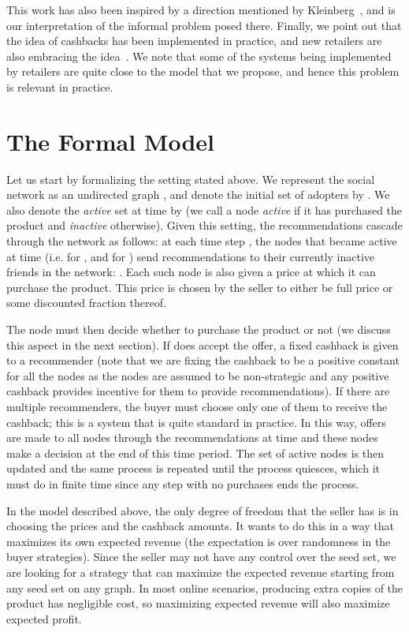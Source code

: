 \documentclass[letterpaper,twoside]{article}
\begin{document}
This work has also been inspired by a direction mentioned by
Kleinberg~\cite{Kleinberg_AGT07}, and is our interpretation of the informal
problem posed there. Finally, we point out that the idea of cashbacks has
been implemented in practice, and new retailers are also embracing the
idea~\cite{LSK06,LAH07,Schon08}. We note that some of the systems being
implemented by retailers are quite close to the model that we propose, and
hence this problem is relevant in practice.

\section{The Formal Model}
\label{sec:model}
Let us start by formalizing the setting stated above. We represent
the social network as an undirected graph , and denote the
initial set of adopters by . We also denote the
{\em active} set at time  by  (we call a node {\em
active} if it has purchased the product and {\em inactive}
otherwise). Given this setting, the recommendations cascade through
the network as follows: at each time step , the nodes that
became active at time  (i.e.  for , and
 for ) send recommendations
to their currently inactive friends in the network: . Each such node 
is also given a price  at which it can purchase the
product. This price is chosen by the seller to either be full price
or some discounted fraction thereof.

The node  must then decide whether to purchase the product or not
(we discuss this aspect in the next section). If  does accept the
offer, a fixed cashback  is given to a recommender
 (note that we are fixing the cashback to be a positive constant for all
the nodes as the nodes are assumed to be non-strategic and any positive
cashback provides incentive for them to provide recommendations). If there are multiple recommenders, the buyer must
choose only one of them to receive the cashback; this is a system that is
quite standard in practice. In this way, offers are made to all nodes  through
the recommendations at time  and these nodes make a decision at
the end of this time period. The set of active nodes is then updated
and the same process is repeated until the process quiesces, which
it must do in finite time since any step with no purchases ends the
process.

In the model described above, the only degree of freedom that the
seller has is in choosing the prices and the cashback amounts. It wants
to do this in a way that maximizes its own expected revenue
(the expectation is over randomness in the buyer strategies). Since
the seller may not have any control over the seed set, we are
looking for a strategy that can maximize the expected revenue starting
from any seed set on any graph. In most
online scenarios, producing extra copies of the product has negligible
cost, so maximizing expected revenue will also maximize expected profit.
\end{document}
